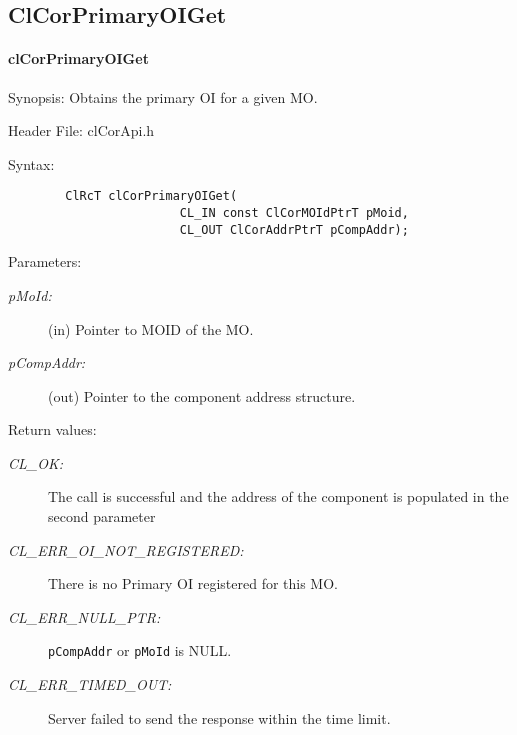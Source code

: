 \begin{flushleft}
\subsection{ClCorPrimaryOIGet}
\hypertarget{pagecor138}{}\paragraph{cl\-Cor\-Primary\-OI\-Get}\label{pagecor138}
\begin{Desc}
\item[Synopsis:]Obtains the primary OI for a given MO.\end{Desc}
\begin{Desc}
\item[Header File:]clCorApi.h\end{Desc}
\begin{Desc}
\item[Syntax:]

\footnotesize\begin{verbatim}        ClRcT clCorPrimaryOIGet(
      					CL_IN const ClCorMOIdPtrT pMoid, 		
      					CL_OUT ClCorAddrPtrT pCompAddr);

\end{verbatim}
\normalsize
\end{Desc}
\begin{Desc}
\item[Parameters:]
\begin{description}
\item[{\em p\-MoId:}](in) Pointer to MOID of the MO.
\item[{\em p\-Comp\-Addr:}](out) Pointer to the component address structure.

\end{description}
\end{Desc}
\begin{Desc}
\item[Return values:]
\begin{description}

\item[{\em CL\_\-OK:}] The call is successful and the address of the component is populated in the second parameter
 \item[{\em CL\_\-ERR\_\-OI\_\-NOT\_\-REGISTERED:}] There is no Primary OI registered for this MO.
 \item[{\em CL\_\-ERR\_\-NULL\_\-PTR:}] {\tt{pCompAddr}} or {\tt{pMoId}} is NULL.
\item[{\em CL\_\-ERR\_\-TIMED\_\-OUT:}] Server failed to send the response within the time limit. 
 


\end{description}
\end{Desc}
\end{flushleft}
